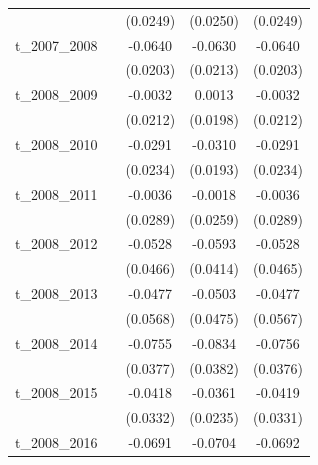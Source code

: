 \begin{table}[htbp]
\begin{tabular}{l*{4}{c}}
            &                     &    (0.0249)         &    (0.0250)         &    (0.0249)         \\
[1em]
t\_2007\_2008 &                     &     -0.0640\sym{***}&     -0.0630\sym{***}&     -0.0640\sym{***}\\
            &                     &    (0.0203)         &    (0.0213)         &    (0.0203)         \\
[1em]
t\_2008\_2009 &                     &     -0.0032         &      0.0013         &     -0.0032         \\
            &                     &    (0.0212)         &    (0.0198)         &    (0.0212)         \\
[1em]
t\_2008\_2010 &                     &     -0.0291         &     -0.0310         &     -0.0291         \\
            &                     &    (0.0234)         &    (0.0193)         &    (0.0234)         \\
[1em]
t\_2008\_2011 &                     &     -0.0036         &     -0.0018         &     -0.0036         \\
            &                     &    (0.0289)         &    (0.0259)         &    (0.0289)         \\
[1em]
t\_2008\_2012 &                     &     -0.0528         &     -0.0593         &     -0.0528         \\
            &                     &    (0.0466)         &    (0.0414)         &    (0.0465)         \\
[1em]
t\_2008\_2013 &                     &     -0.0477         &     -0.0503         &     -0.0477         \\
            &                     &    (0.0568)         &    (0.0475)         &    (0.0567)         \\
[1em]
t\_2008\_2014 &                     &     -0.0755\sym{**} &     -0.0834\sym{**} &     -0.0756\sym{**} \\
            &                     &    (0.0377)         &    (0.0382)         &    (0.0376)         \\
[1em]
t\_2008\_2015 &                     &     -0.0418         &     -0.0361         &     -0.0419         \\
            &                     &    (0.0332)         &    (0.0235)         &    (0.0331)         \\
[1em]
t\_2008\_2016 &                     &     -0.0691         &     -0.0704\sym{**} &     -0.0692         \\

\end{tabular}
\end{table}
